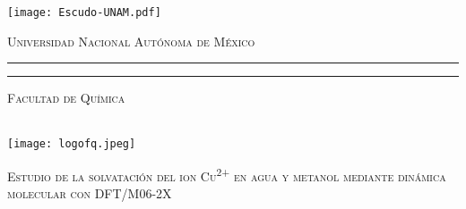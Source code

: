 
\begin{titlepage}
    \thispagestyle{empty}
    \begin{minipage}[c][0.17\textheight][c]{0.23\textwidth}
        \begin{center}
            \texttt{[image: Escudo-UNAM.pdf]}
        \end{center}
    \end{minipage}
    \begin{minipage}[c][0.195\textheight][t]{0.725\textwidth}
        \begin{center}
            \vspace{0.3cm}
            \textsc{\large Universidad Nacional Aut\'onoma de M\'exico}\\[0.5cm]
            \vspace{0.3cm}
            \hrule height2.5pt
            \vspace{.2cm}
            \hrule height1pt
            \vspace{.8cm}
            \textsc{Facultad de Química}\\[0.5cm] %
        \end{center}
    \end{minipage}

    \begin{minipage}[c][0.81\textheight][t]{0.20\textwidth}
        \vspace*{5mm}
        \begin{center}
            \hskip2.0mm
            \vrule width1pt height13cm 
            \vspace{5mm}
            \hskip2pt
            \vrule width2.5pt height13cm
            \hskip2mm
            \vrule width1pt height13cm \\
            \vspace{5mm}
            \texttt{[image: logofq.jpeg]}
        \end{center}
    \end{minipage}
    \begin{minipage}[c][0.81\textheight][t]{0.75\textwidth}
        \begin{center}
            \vspace{1cm}

            {\large\scshape Estudio de la solvatación del ion Cu\textsuperscript{2+} en agua y metanol mediante dinámica molecular con DFT/M06-2X}\\[.2in]

            \vspace{2cm}            


\end{center}
\end{minipage}
\end{titlepage}
